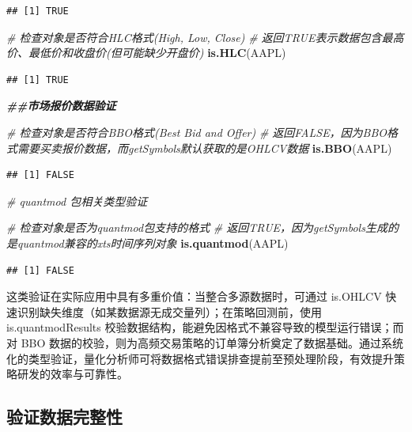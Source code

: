 \documentclass[]{ctexbook}
\newenvironment{Shaded}{\begin{snugshade}}{\end{snugshade}}
\newcommand{\CommentTok}[1]{\textcolor[rgb]{0.56,0.35,0.01}{\textit{#1}}}
\newcommand{\DocumentationTok}[1]{\textcolor[rgb]{0.56,0.35,0.01}{\textbf{\textit{#1}}}}
\newcommand{\FunctionTok}[1]{\textcolor[rgb]{0.13,0.29,0.53}{\textbf{#1}}}
\newcommand{\NormalTok}[1]{#1}
\begin{document}
\begin{verbatim}
## [1] TRUE
\end{verbatim}

\begin{Shaded}
\begin{Highlighting}[]
\CommentTok{\# 检查对象是否符合HLC格式(High, Low, Close)}
\CommentTok{\# 返回TRUE表示数据包含最高价、最低价和收盘价(但可能缺少开盘价)}
\FunctionTok{is.HLC}\NormalTok{(AAPL)}
\end{Highlighting}
\end{Shaded}

\begin{verbatim}
## [1] TRUE
\end{verbatim}

\begin{Shaded}
\begin{Highlighting}[]
\DocumentationTok{\#\#市场报价数据验证}

\CommentTok{\# 检查对象是否符合BBO格式(Best Bid and Offer)}
\CommentTok{\# 返回FALSE，因为BBO格式需要买卖报价数据，而getSymbols默认获取的是OHLCV数据}
\FunctionTok{is.BBO}\NormalTok{(AAPL)}
\end{Highlighting}
\end{Shaded}

\begin{verbatim}
## [1] FALSE
\end{verbatim}

\begin{Shaded}
\begin{Highlighting}[]
\CommentTok{\# quantmod 包相关类型验证}

\CommentTok{\# 检查对象是否为quantmod包支持的格式}
\CommentTok{\# 返回TRUE，因为getSymbols生成的是quantmod兼容的xts时间序列对象}
\FunctionTok{is.quantmod}\NormalTok{(AAPL)}
\end{Highlighting}
\end{Shaded}

\begin{verbatim}
## [1] FALSE
\end{verbatim}

这类验证在实际应用中具有多重价值：当整合多源数据时，可通过 is.OHLCV 快速识别缺失维度（如某数据源无成交量列）；在策略回测前，使用 is.quantmodResults 校验数据结构，能避免因格式不兼容导致的模型运行错误；而对 BBO 数据的校验，则为高频交易策略的订单簿分析奠定了数据基础。通过系统化的类型验证，量化分析师可将数据格式错误排查提前至预处理阶段，有效提升策略研发的效率与可靠性。

\subsection{验证数据完整性}\label{ux9a8cux8bc1ux6570ux636eux5b8cux6574ux6027}
\end{document}
